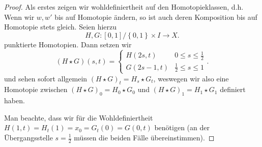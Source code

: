 \begin{proof}
    Als erstes zeigen wir wohldefiniertheit auf den Homotopieklassen, d.h. Wenn wir $w,w'$ bis auf Homotopie ändern, so ist auch deren Komposition bis auf Homotopie stets gleich. Seien hierzu
    \[
        H,G \colon  [0,1] / \left \{0,1\right\} \times I \to  X
    .\] 
    punktierte Homotopien. Dann setzen wir
    \[
        (H \star G)(s,t) = \begin{cases}
            H(2s,t) & 0 \leq  s \leq  \frac{1}{2} \\
            G(2s-1,t) & \frac{1}{2}\leq s\leq 1
        \end{cases}
    .\]
    und sehen sofort allgemein $(H\star G)_t = H_s \star G_t$, weswegen wir also eine Homotopie zwischen  $(H \star G)_0 = H_0 \star G_0$ und  $(H\star G)_1 = H_1 \star G_1$ definiert haben.

    Man beachte, dass wir für die Wohldefiniertheit $H(1,t) =H_t(1) =  x_0 = G_t(0) = G(0,t)$ benötigen (an der Übergangsstelle $s = \frac{1}{2}$ müssen die beiden Fälle übereinstimmen).


\end{proof}
